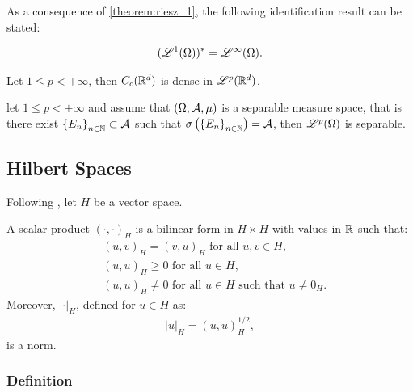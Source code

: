 As a consequence of \autoref{theorem:riesz_1}, the following identification result can be stated:

\begin{theorem}
    \begin{gather}
        (\mathscr{L}^{1}(\Omega))^* = \mathscr{L}^{\infty}(\Omega).
    \end{gather}
\end{theorem}

\begin{theorem}
    Let $1 \leq p < +\infty$, then $C_c(\mathbb{R}^{d})$ is dense in $\mathscr{L}^{p}(\mathbb{R}^{d})$.
\end{theorem}

\begin{theorem}
    let $1 \leq p < +\infty$ and assume that $(\Omega, \mathcal{A}, \mu)$ is a separable measure space, that is there exist $\left\{ E_n \right\}_{n \in \mathbb{N}} \subset \mathcal{A}$ such that $\sigma \left( \left\{ E_n \right\}_{n \in \mathbb{N}} \right) = \mathcal{A}$, then $\mathscr{L}^{p}(\Omega)$ is separable.
\end{theorem}

\newpage
\subsection{Hilbert Spaces}

Following \cite[p. 131]{Brezis2010}, let $H$ be a vector space.

\begin{definition}
    A scalar product $\left( \cdot, \cdot \right)_H$ is a bilinear form in $H \times H$ with values in $\mathbb{R}$ such that:
    \begin{align}
        & (u, v)_H = (v, u)_H \text{ for all } u, v \in H, \\
        & (u, u)_H \geq 0 \text{ for all } u \in H, \\
        & (u, u)_H \neq 0 \text{ for all } u \in H \text{ such that } u \neq 0_H.
    \end{align}
    Moreover, $\lvert \cdot \rvert_H$, defined for $u \in H$ as:
    \begin{gather}
        \lvert u \rvert_H = (u, u)_H^{1/2},
    \end{gather}
    is a norm.
\end{definition}

\subsubsection{Definition}

